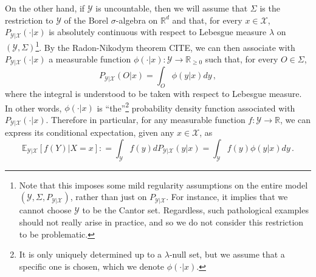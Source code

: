 \documentclass[twoside,11pt]{article}
\newcommand{\reals}{\mathbb{R}}
\newcommand{\realsnonneg}{\reals_{\geq 0}}
\newcommand{\states}{\mathcal{X}}
\newcommand{\observs}{\mathcal{Y}}
\newcommand{\coloneqq}{:\!=}
\begin{document}
On the other hand, if $\observs$ is uncountable, then we will assume that $\Sigma$ is the restriction to $\observs$ of the Borel $\sigma$-algebra on $\reals^d$ and that, for every $x\in\states$, $P_{\observs\vert\states}(\cdot\vert x)$ is absolutely continuous with respect to Lebesgue measure $\lambda$ on $(\observs,\Sigma)$\footnote{Note that this imposes some mild regularity assumptions on the entire model $(\observs,\Sigma,P_{\observs\vert\states})$, rather than just on $P_{\observs\vert\states}$. For instance, it implies that we cannot choose $\observs$ to be the Cantor set. Regardless, such pathological examples should not really arise in practice, and so we do not consider this restriction to be problematic.}. By the Radon-Nikodym theorem CITE, we can then associate with $P_{\observs\vert\states}(\cdot\vert x)$ a measurable function $\phi(\cdot\vert x):\observs\to\realsnonneg$ such that, for every $O\in\Sigma$,
\begin{equation*}
P_{\observs\vert\states}(O\vert x) = \int_O\phi(y\vert x)dy\,,
\end{equation*}
where the integral is understood to be taken with respect to Lebesgue measure. In other words, $\phi(\cdot\vert x)$ is ``the''\footnote{It is only uniquely determined up to a $\lambda$-null set, but we assume that a specific one is chosen, which we denote $\phi(\cdot\vert x)$.} probability density function associated with $P_{\observs\vert\states}(\cdot\vert x)$. Therefore in particular, for any measurable function $f:\observs\to\reals$, we can express its conditional expectation, given any $x\in\states$, as
\begin{equation*}
\mathbb{E}_{\observs\vert\states}[f(Y)\vert X=x] \coloneqq \int_\observs f(y) dP_{\observs\vert\states}(y\vert x) = \int_\observs f(y)\phi(y\vert x)dy\,.
\end{equation*}
\end{document}
